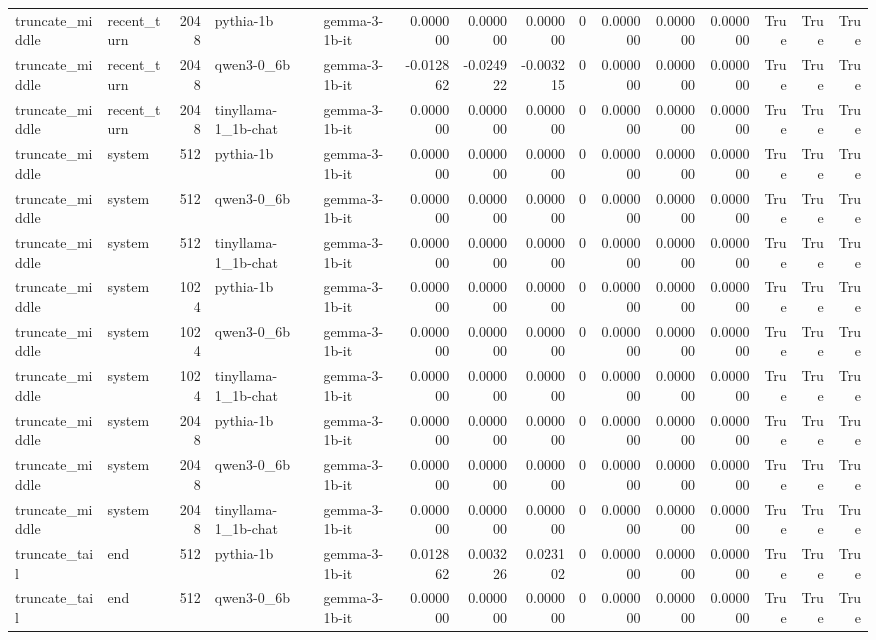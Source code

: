 \begin{tabular}{llrllrrrrrrrrrr}
truncate_middle & recent_turn & 2048 & pythia-1b & gemma-3-1b-it & 0.000000 & 0.000000 & 0.000000 & 0 & 0.000000 & 0.000000 & 0.000000 & True & True & True \\
truncate_middle & recent_turn & 2048 & qwen3-0_6b & gemma-3-1b-it & -0.012862 & -0.024922 & -0.003215 & 0 & 0.000000 & 0.000000 & 0.000000 & True & True & True \\
truncate_middle & recent_turn & 2048 & tinyllama-1_1b-chat & gemma-3-1b-it & 0.000000 & 0.000000 & 0.000000 & 0 & 0.000000 & 0.000000 & 0.000000 & True & True & True \\
truncate_middle & system & 512 & pythia-1b & gemma-3-1b-it & 0.000000 & 0.000000 & 0.000000 & 0 & 0.000000 & 0.000000 & 0.000000 & True & True & True \\
truncate_middle & system & 512 & qwen3-0_6b & gemma-3-1b-it & 0.000000 & 0.000000 & 0.000000 & 0 & 0.000000 & 0.000000 & 0.000000 & True & True & True \\
truncate_middle & system & 512 & tinyllama-1_1b-chat & gemma-3-1b-it & 0.000000 & 0.000000 & 0.000000 & 0 & 0.000000 & 0.000000 & 0.000000 & True & True & True \\
truncate_middle & system & 1024 & pythia-1b & gemma-3-1b-it & 0.000000 & 0.000000 & 0.000000 & 0 & 0.000000 & 0.000000 & 0.000000 & True & True & True \\
truncate_middle & system & 1024 & qwen3-0_6b & gemma-3-1b-it & 0.000000 & 0.000000 & 0.000000 & 0 & 0.000000 & 0.000000 & 0.000000 & True & True & True \\
truncate_middle & system & 1024 & tinyllama-1_1b-chat & gemma-3-1b-it & 0.000000 & 0.000000 & 0.000000 & 0 & 0.000000 & 0.000000 & 0.000000 & True & True & True \\
truncate_middle & system & 2048 & pythia-1b & gemma-3-1b-it & 0.000000 & 0.000000 & 0.000000 & 0 & 0.000000 & 0.000000 & 0.000000 & True & True & True \\
truncate_middle & system & 2048 & qwen3-0_6b & gemma-3-1b-it & 0.000000 & 0.000000 & 0.000000 & 0 & 0.000000 & 0.000000 & 0.000000 & True & True & True \\
truncate_middle & system & 2048 & tinyllama-1_1b-chat & gemma-3-1b-it & 0.000000 & 0.000000 & 0.000000 & 0 & 0.000000 & 0.000000 & 0.000000 & True & True & True \\
truncate_tail & end & 512 & pythia-1b & gemma-3-1b-it & 0.012862 & 0.003226 & 0.023102 & 0 & 0.000000 & 0.000000 & 0.000000 & True & True & True \\
truncate_tail & end & 512 & qwen3-0_6b & gemma-3-1b-it & 0.000000 & 0.000000 & 0.000000 & 0 & 0.000000 & 0.000000 & 0.000000 & True & True & True \\

\end{tabular}
